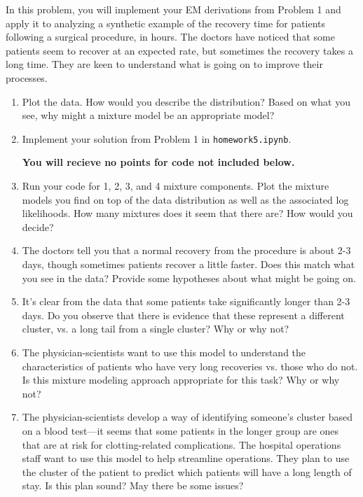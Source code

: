 \documentclass[submit]{harvardml}
\begin{document}
\begin{problem}

  In this problem, you will implement your EM derivations from Problem
  1 and apply it to analyzing a synthetic example of the recovery time
  for patients following a surgical procedure, in hours.  The doctors
  have noticed that some patients seem to recover at an expected rate,
  but sometimes the recovery takes a long time.  They are keen to
  understand what is going on to improve their processes.  
  
  \begin{enumerate}

  \item Plot the data.  How would you describe the distribution?
    Based on what you see, why might a mixture model be an appropriate
    model?  
    
  \item Implement your solution from Problem 1 in \texttt{homework5.ipynb}.

{\bfseries You will recieve no points for code not included below.}

 
\item Run your code for 1, 2, 3, and 4 mixture components.  Plot the
  mixture models you find on top of the data distribution as well as
  the associated log likelihoods.  How many mixtures does it seem that
  there are?  How would you decide?
  
\item The doctors tell you that a normal recovery from the procedure
  is about 2-3 days, though sometimes patients recover a little
  faster.  Does this match what you see in the data?  Provide some
  hypotheses about what might be going on.

\item It's clear from the data that some patients take significantly
  longer than 2-3 days.  Do you observe that there is evidence that
  these represent a different cluster, vs. a long tail from a single
  cluster?  Why or why not?

\item The physician-scientists want to use this model to understand
  the characteristics of patients who have very long recoveries
  vs. those who do not.  Is this mixture modeling approach appropriate
  for this task?  Why or why not?

\item The physician-scientists develop a way of identifying someone's
  cluster based on a blood test---it seems that some patients in the
  longer group are ones that are at risk for clotting-related
  complications.  The hospital operations staff want to use this model
  to help streamline operations.  They plan to use the cluster of the
  patient to predict which patients will have a long length of stay.
  Is this plan sound?  May there be some issues?
  
  \end{enumerate} 
  
\end{problem} 
\end{document}
